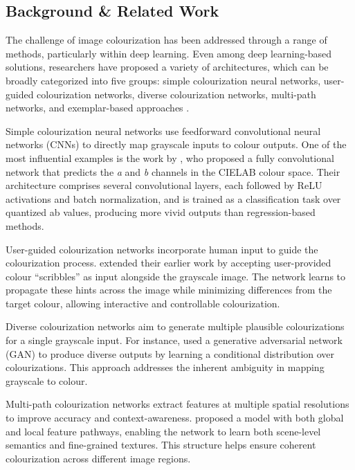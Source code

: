 \documentclass{article} %
\begin{document}
\subsection{Background \& Related Work}

The challenge of image colourization has been addressed through a range of methods, particularly within deep learning. Even among deep learning-based solutions, researchers have proposed a variety of architectures, which can be broadly categorized into five groups: simple colourization neural networks, user-guided colourization networks, diverse colourization networks, multi-path networks, and exemplar-based approaches \citep{zeger2021grayscale}.

Simple colourization neural networks use feedforward convolutional neural networks (CNNs) to directly map grayscale inputs to colour outputs. One of the most influential examples is the work by \citet{zhang2016colorful}, who proposed a fully convolutional network that predicts the \textit{a} and \textit{b} channels in the CIELAB colour space. Their architecture comprises several convolutional layers, each followed by ReLU activations and batch normalization, and is trained as a classification task over quantized ab values, producing more vivid outputs than regression-based methods.

User-guided colourization networks incorporate human input to guide the colourization process. \citet{zhang2017real} extended their earlier work by accepting user-provided colour “scribbles” as input alongside the grayscale image. The network learns to propagate these hints across the image while minimizing differences from the target colour, allowing interactive and controllable colourization.

Diverse colourization networks aim to generate multiple plausible colourizations for a single grayscale input. For instance, \citet{Vitoria2020ChromaGAN} used a generative adversarial network (GAN) to produce diverse outputs by learning a conditional distribution over colourizations. This approach addresses the inherent ambiguity in mapping grayscale to colour.

Multi-path colourization networks extract features at multiple spatial resolutions to improve accuracy and context-awareness. \citet{Iizuka2016Colourization} proposed a model with both global and local feature pathways, enabling the network to learn both scene-level semantics and fine-grained textures. This structure helps ensure coherent colourization across different image regions.
\end{document}
